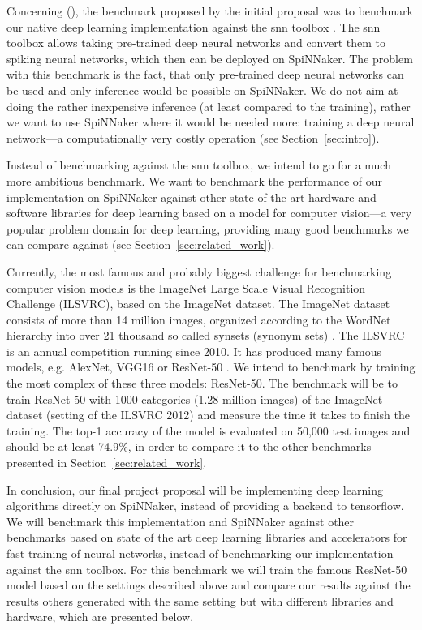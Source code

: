 \documentclass{article}
\begin{document}
Concerning (), the benchmark proposed by the
initial proposal was to benchmark our native deep learning
implementation against the snn toolbox
\citep{rueckauer_et_al_2017}.
The snn toolbox allows taking pre-trained deep neural
networks and convert them to spiking neural networks, which
then can be deployed on SpiNNaker.
The problem with this benchmark is the fact, that only
pre-trained deep neural networks can be used and only
inference would be possible on SpiNNaker.
We do not aim at doing the rather inexpensive inference
(at least compared to the training), rather we want to
use SpiNNaker where it would be needed more: training
a deep neural network---a computationally very costly
operation (see Section~\ref{sec:intro}).

Instead of benchmarking against the snn toolbox, we intend
to go for a much more ambitious benchmark.
We want to benchmark the performance of our implementation
on SpiNNaker against other state of the art hardware and
software libraries for deep learning based on a model for
computer vision---a very popular problem domain for deep
learning, providing many good benchmarks we can compare
against (see Section~\ref{sec:related_work}).

Currently, the most famous and probably biggest challenge
for benchmarking computer vision models is the
ImageNet Large Scale Visual Recognition Challenge (ILSVRC),
based on the ImageNet dataset.
The ImageNet dataset consists of more than 14 million
images, organized according to the WordNet hierarchy into
over 21 thousand so called synsets (synonym sets)
\citep{imagenet, wordnet}.
The ILSVRC is an annual competition running since 2010.
It has produced many famous models, e.g. AlexNet, VGG16 or
ResNet-50 \citep{alexnet, simonyan_et_al_2014,
  he_et_al_2015}.
We intend to benchmark by training the most complex of
these three models: ResNet-50.
The benchmark will be to train ResNet-50 with 1000
categories (1.28 million images) of the ImageNet dataset
(setting of the ILSVRC 2012) and measure the time it takes
to finish the training.
The top-1 accuracy of the model is evaluated on 50,000 test
images and should be at least 74.9\%, in order to compare
it to the other benchmarks presented in
Section~\ref{sec:related_work}.

In conclusion, our final project proposal will be
implementing deep learning algorithms directly on
SpiNNaker, instead of providing a backend to tensorflow.
We will benchmark this implementation and SpiNNaker against
other benchmarks based on state of the art deep learning
libraries and accelerators for fast training of neural
networks, instead of benchmarking our implementation
against the snn toolbox.
For this benchmark we will train the famous ResNet-50 model
based on the settings described above and compare our
results against the results others generated with the same
setting but with different libraries and hardware, which
are presented below.
\end{document}
